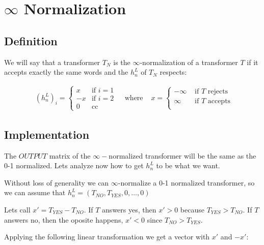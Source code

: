 \section*{$\infty$ Normalization}

\subsection*{Definition}

We will say that a transformer $T_N$ is the $\infty$-normalization of a transformer $T$ if it accepts exactly the same words and the $h_n^L$ of $T_N$ respects:


\begin{align*}
    & (h_n^L)_i =
    \begin{cases}
    x & \text{if } i = 1 \\
    -x & \text{if } i = 2 \\
    0 & \text{cc }
    \end{cases} 
    & \text{ where }
    & x = 
    \begin{cases}
    -\infty & \text{ if $T$ rejects }  \\
    \infty & \text{ if $T$ accepts } \\
    \end{cases} 
\end{align*}


\subsection*{Implementation}
The $OUTPUT$ matrix of the $\infty-$normalized transformer will be the same as the 0-1 normalized. Lets analyze now how to get $h_n^L$ to be what we want.

Without loss of generality we can $\infty$-normalize a 0-1 normalized transformer, so we can assume that $h_n^L = (T_{NO}, T_{YES}, 0, \dots, 0)$

Lets call $x' = T_{YES} - T_{NO}$. If $T$ answers yes, then $x' > 0$ because $T_{YES} > T_{NO}$. If $T$ answers no, then the oposite happens, $x' < 0$ since $T_{NO} > T_{YES}$.

Applying the following linear transformation we get a vector with $x'$ and $-x'$:

